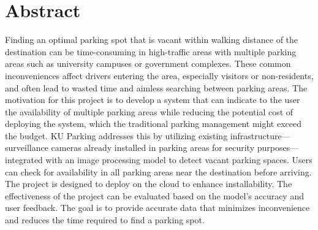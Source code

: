 \chapter*{Abstract}
\label{chap:abstract}

Finding an optimal parking spot that is vacant within walking distance of the destination can be time-consuming in high-traffic areas with multiple parking areas such as university campuses or government complexes.
These common inconveniences affect drivers entering the area, especially visitors or non-residents, and often lead to wasted time and aimless searching between parking areas. The motivation for this project is to develop a system that can indicate to the user the availability of multiple parking areas while reducing the potential cost of deploying the system, which the traditional parking management might exceed the budget. 
KU Parking addresses this by utilizing existing infrastructure—surveillance cameras already installed in parking areas for security purposes—integrated with an image processing model to detect vacant parking spaces.
Users can check for availability in all parking areas near the destination before arriving.
The project is designed to deploy on the cloud to enhance installability. 
The effectiveness of the project can be evaluated based on the model's accuracy and user feedback.
The goal is to provide accurate data that minimizes inconvenience and reduces the time required to find a parking spot.
